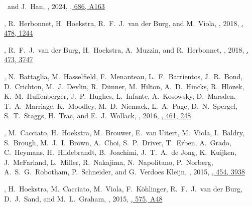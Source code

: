 
\item
\myself\ and J.~Han,
,
2024, \href{https://ui.adsabs.harvard.edu/abs/2024A&A...686A.163S}{\aap, 686, A163}

\item
\myself, R.~Herbonnet, H.~Hoekstra, R.~F.~J.~van der Burg, and M.~Viola,
,
2018, \href{https://ui.adsabs.harvard.edu/abs/2018MNRAS.478.1244S}{\mnras, 478, 1244}

\item
\myself, R.~F.~J.~van der Burg, H.~Hoekstra, A.~Muzzin, and R.~Herbonnet,
,
2018, \href{https://ui.adsabs.harvard.edu/abs/2018MNRAS.473.3747S}{\mnras, 473, 3747}

\item
\myself, N.~Battaglia, M.~Hasselfield, F.~Menanteau, L.~F.~Barrientos, J.~R.~Bond, D.~Crichton, M.~J.~Devlin, R.~Dünner, M.~Hilton, A.~D.~Hincks, R.~Hlozek, K.~M.~Huffenberger, J.~P.~Hughes, L.~Infante, A.~Kosowsky, D.~Marsden, T.~A.~Marriage, K.~Moodley, M.~D.~Niemack, L.~A.~Page, D.~N.~Spergel, S.~T.~Staggs, H.~Trac, and E.~J.~Wollack,
,
2016, \href{https://ui.adsabs.harvard.edu/abs/2016MNRAS.461..248S}{\mnras, 461, 248}

\item
\myself, M.~Cacciato, H.~Hoekstra, M.~Brouwer, E.~van Uitert, M.~Viola, I.~Baldry, S.~Brough, M.~J.~I.~Brown, A.~Choi, S.~P.~Driver, T.~Erben, A.~Grado, C.~Heymans, H.~Hildebrandt, B.~Joachimi, J.~T.~A.~de Jong, K.~Kuijken, J.~McFarland, L.~Miller, R.~Nakajima, N.~Napolitano, P.~Norberg, A.~S.~G.~Robotham, P.~Schneider, and G.~Verdoes Kleijn,
,
2015, \href{https://ui.adsabs.harvard.edu/abs/2015MNRAS.454.3938S}{\mnras, 454, 3938}

\item
\myself, H.~Hoekstra, M.~Cacciato, M.~Viola, F.~Köhlinger, R.~F.~J.~van der Burg, D.~J.~Sand, and M.~L.~Graham,
,
2015, \href{https://ui.adsabs.harvard.edu/abs/2015A&A...575A..48S}{\aap, 575, A48}


